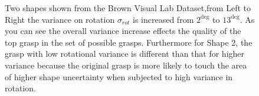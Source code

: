 \documentclass[journal,transmag]{IEEEtran}%
\begin{document}
\begin{figure}%
    \centering
    \qquad
    \caption{Two shapes shown from the Brown Visual Lab Dataset,from Left to Right the variance on rotation $\sigma_{rot}$ is increased from $2^{\deg}$ to $13^{\deg}$. As you can see the overall variance increase effects the quality of the top grasp in the set of possible grasps. Furthermore for Shape 2, the grasp with low rotational variance is different than that for higher variance because the original grasp is more likely to touch the area of higher shape uncertainty when subjected to high variance in rotation.  }%
    \label{fig:rot_shapes}%
\end{figure}
\end{document}
